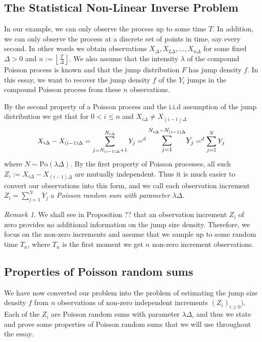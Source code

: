 \documentclass[a4paper,11pt]{article}
\theoremstyle{theorem}
\theoremstyle{definition}
\theoremstyle{remark}
\newtheorem*{rem}{Remark}
\begin{document}
\subsection{The Statistical Non-Linear Inverse Problem}

In our example, we can only observe the process up to some time $T$. In addition, we can only observe the process at a discrete set of points in time, say every second. In other words we obtain observations $X_{\Delta}, X_{2\Delta}, \dotsc, X_{n\Delta}$ for some fixed $\Delta > 0$ and $n := \left\lfloor \frac{T}{\Delta} \right\rfloor$. We also assume that the intensity $\lambda$ of the compound Poisson process is known and that the jump distribution $F$ has jump density $f$. In this essay, we want to recover the jump density $f$ of the $Y_i$ jumps in the compound Poisson process from these $n$ observations.

By the second property of a Poisson process and the i.i.d assumption of the jump distribution we get that for $0 < i \leq n$ and $X_{i\Delta} \neq X_{(i-1)\Delta}$
\[
X_{i\Delta} - X_{(i-1)\Delta} = \sum_{j=N_{(i-1)\Delta} + 1}^{N_{i\Delta}}{Y_j} 
=^{d} \mathlarger{\mathlarger{\sum}_{j=1}^{N_{i\Delta} - N_{(i-1)\Delta}}{Y_j}} =^{d} \sum_{j=1}^{N}{Y_j}
\]
where $N \sim \mathrm{Po}(\lambda\Delta)$. By the first property of Poisson processes, all such $Z_i := X_{i\Delta} - X_{(i-1)\Delta}$ are mutually independent. Thus it is much easier to convert our observations into this form, and we call each observation increment $Z_i = \sum_{j=1}^{N}{Y_j}$ a \textit{Poisson random sum with parameter $\lambda \Delta$}.  

\begin{rem}
We shall see in Proposition ?? that an observation increment $Z_i$ of zero provides no additional information on the jump size density. Therefore, we focus on the non-zero increments and assume that we sample up to some random time $T_n$, where $T_n$ is the first moment we get $n$ non-zero increment observations.
\end{rem}

\subsection{Properties of Poisson random sums}

We have now converted our problem into the problem of estimating the jump size density $f$ from $n$ observations of non-zero independent increments $(Z_i)_{i \geq 0})$. Each of the $Z_i$ are Poisson random sums with parameter $\lambda \Delta$, and thus we state and prove some properties of Poisson random sums that we will use throughout the essay.
\end{document}
